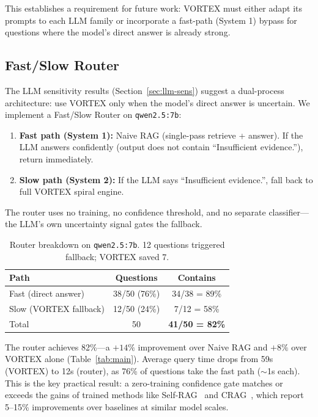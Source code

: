 \documentclass{zapiski}
\begin{document}
This establishes a requirement for future work: VORTEX must either adapt its prompts to each LLM family or incorporate a fast-path (System 1) bypass for questions where the model's direct answer is already strong.

\subsection{Fast/Slow Router}

The LLM sensitivity results (Section~\ref{sec:llm-sens}) suggest a dual-process architecture: use VORTEX only when the model's direct answer is uncertain. We implement a Fast/Slow Router on \texttt{qwen2.5:7b}:

\begin{enumerate}
    \item \textbf{Fast path (System 1):} Naive RAG (single-pass retrieve + answer). If the LLM answers confidently (output does not contain ``Insufficient evidence.''), return immediately.
    \item \textbf{Slow path (System 2):} If the LLM says ``Insufficient evidence.'', fall back to full VORTEX spiral engine.
\end{enumerate}

The router uses no training, no confidence threshold, and no separate classifier---the LLM's own uncertainty signal gates the fallback.

\begin{table}[h]
\centering
\begin{tabular}{lcc}
\toprule
Path & Questions & Contains \\
\midrule
Fast (direct answer) & 38/50 (76\%) & 34/38 = 89\% \\
Slow (VORTEX fallback) & 12/50 (24\%) & 7/12 = 58\% \\
\midrule
Total & 50 & \textbf{41/50 = 82\%} \\
\bottomrule
\end{tabular}
\caption{Router breakdown on \texttt{qwen2.5:7b}. 12 questions triggered fallback; VORTEX saved 7.}
\label{tab:router}
\end{table}

The router achieves 82\%---a $+14\%$ improvement over Naive RAG and $+8\%$ over VORTEX alone (Table~\ref{tab:main}). Average query time drops from 59s (VORTEX) to 12s (router), as 76\% of questions take the fast path ($\sim$1s each). This is the key practical result: a zero-training confidence gate matches or exceeds the gains of trained methods like Self-RAG~\cite{asai2024selfrag} and CRAG~\cite{yan2024crag}, which report 5--15\% improvements over baselines at similar model scales.
\end{document}
